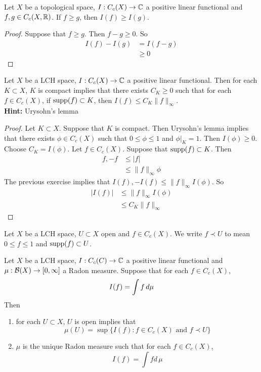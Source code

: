 \documentclass{book}
\begin{document}
	\begin{ex}  
	Let $X$ be a topological space, $I: C_c(X) \rightarrow \mathbb{C}$ a positive linear functional and $f,g \in C_c(X, \mathbb{R})$. If $f \geq g$, then $I(f) \geq I (g)$.  
	\end{ex}	
	
	\begin{proof}
	Suppose that $f \geq g$. Then $f - g \geq 0$. So 
	\begin{align*}
	I(f) - I(g) 
	&= I(f -g) \\
	&\geq 0
	\end{align*}
	\end{proof}
	
	
	
	\begin{ex}  
	Let $X$ be a LCH space, $I: C_c(X) \rightarrow \mathbb{C}$ a positive linear functional. Then for each $K \subset X$, $K $ is compact implies that there exists $C_K \geq 0$ such that for each $f \in C_c(X)$, if $\operatorname{supp}(f) \subset K$, then $I(f) \leq C_K \|f\|_{\infty}$.\\
	\textbf{Hint:} Urysohn's lemma 
	\end{ex}
	
	\begin{proof}
	Let $K \subset X$. Suppose that $K$ is compact. Then Urysohn's lemma implies that there exists $\phi \in C_c(X)$ such that $0 \leq \phi \leq 1$ and $\phi|_K = 1$. Then $I(\phi) \geq 0$. Choose $C_K = I(\phi)$. Let $f \in C_c(X)$. Suppose that $\operatorname{supp}(f) \subset K$. Then 
	\begin{align*}
	f,-f 
	&\leq |f| \\
	& \leq \|f\|_{\infty} \phi
	\end{align*}
	The previous exercise implies that $I(f), -I(f) \leq \|f\|_{\infty} I(\phi)$. So 
	\begin{align*}
	|I(f)| 
	&\leq \|f\|_{\infty} I(\phi) \\
	&\leq  C_K \|f\|_{\infty}  
	\end{align*}
	\end{proof}
	
	\begin{note}
	Let $X$ be a LCH space, $U \subset X$ open and $f \in C_c(X)$. We write $f \prec U$ to mean $0 \leq f \leq 1$ and $\operatorname{supp}(f) \subset U$. 
	\end{note}
	
	\begin{ex}  
	Let $X$ be a LCH space, $I: C_c(C) \rightarrow \mathbb{C}$ a positive linear functional and $\mu:\mathcal{B}(X) \rightarrow [0,\infty]$ a Radon measure. Suppose that for each $f \in C_c(X)$, $$I(f) = \int f \, d \mu$$
	Then 
	\begin{enumerate}
	\item for each $U \subset X$, $U$ is open implies that $$\mu(U) = \sup \{I(f): f \in C_c(X) \text{ and } f \prec U \}$$ 
	\item $\mu$ is the unique Radon measure such that for each $f \in C_c(X)$, $$I(f) = \int f d \, \mu$$
\end{enumerate}	 
	\end{ex}
	
\end{document}

